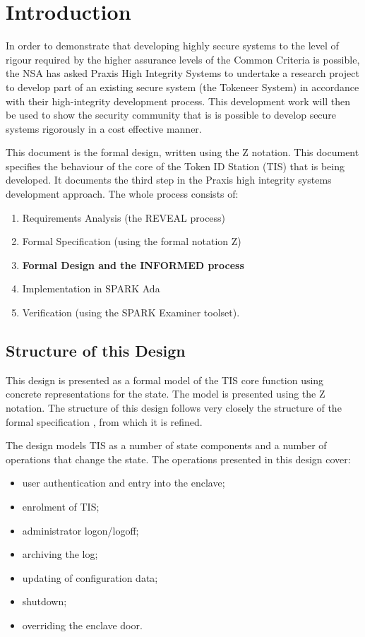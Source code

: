 \chapter{Introduction}
In order to demonstrate that developing highly secure systems to the
level of rigour required by the higher assurance levels of the Common
Criteria is possible, the NSA has asked Praxis High Integrity Systems to
undertake a research project to develop part of an existing secure
system (the Tokeneer System) in accordance with their high-integrity
development process. This development work will then be used to
show the security community that is is possible to develop secure
systems rigorously in a cost effective manner.

This document is the formal design, written using the Z
notation. This document specifies the behaviour of the core of the Token
ID Station (TIS) that is being developed.
It documents the third step in the Praxis high
integrity systems development approach. The whole process consists of:

\begin{enumerate}
\item
Requirements Analysis (the REVEAL process)
\item
Formal Specification (using the formal notation Z)
\item
{\bf Formal Design and the INFORMED process}
\item
Implementation in SPARK Ada
\item
Verification (using the SPARK Examiner toolset).
\end{enumerate}

\section{Structure of this Design}
This design is presented as a formal model of the TIS core function
using concrete representations for the state. 
The model is presented using the Z notation. 
The structure of this design follows very closely the structure of the
formal specification \cite{FS}, from which it is refined.

The design models TIS as a number of state components and a number of
operations that change the state.  The operations presented in this
design cover:
\begin{itemize}
\item
user authentication and entry into the enclave;
\item
enrolment of TIS;
\item
administrator logon/logoff;
\item
archiving the log;
\item
updating of configuration data;
\item
shutdown;
\item
overriding the enclave door.
\end{itemize}

